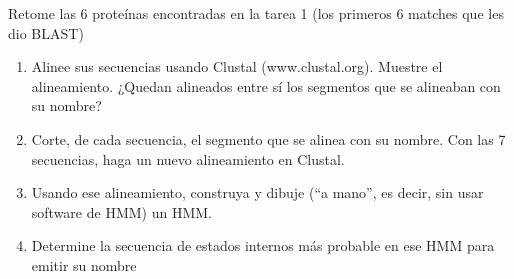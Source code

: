 Retome las 6 proteínas encontradas en la tarea 1 (los primeros 6 matches que les dio BLAST)

\begin{enumerate}
\item Alinee sus secuencias usando Clustal (www.clustal.org). Muestre el alineamiento. ¿Quedan
alineados entre sí los segmentos que se alineaban con su nombre?


\item Corte, de cada secuencia, el segmento que se alinea con su nombre. Con las 7 secuencias,
haga un nuevo alineamiento en Clustal.


\item Usando ese alineamiento, construya y dibuje (“a mano”, es decir, sin usar software de HMM)
un HMM.


\item Determine la secuencia de estados internos más probable en ese HMM para emitir su
nombre


\end{enumerate}
